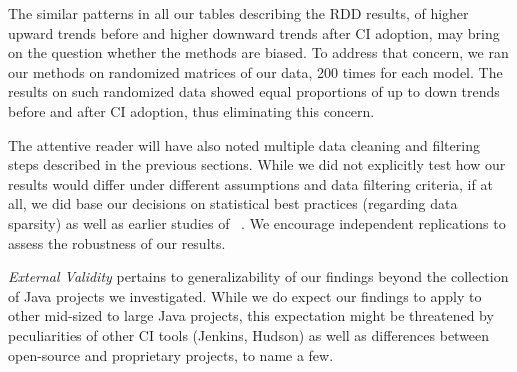  The similar patterns in all our tables describing the RDD results, of higher upward trends before and higher downward trends after CI adoption, may bring on the question whether the methods are biased. To address that concern, we ran our methods on randomized matrices of our data, 200 times for each model. The results on such randomized data showed equal proportions of up to down trends before and after CI adoption, thus eliminating this concern.
 
 
The attentive reader will have also noted multiple data cleaning and filtering 
steps described in the previous sections.
While we did not explicitly test how our results would differ under different
assumptions and data filtering criteria, if at all, we did base our decisions on
statistical best practices (\eg regarding data sparsity) as well as 
earlier studies of \Tvis~\cite{era14,%
VasilescuYWDF15, yue2015wait, BellerGZ16, Hilton2016, Yu2016}.
We encourage independent replications to assess the robustness of our results.
 


\smallskip \emph{External Validity} pertains to generalizability of our findings 
beyond the collection of \GH Java projects we investigated.
While we do expect our findings to apply to other mid-sized to large Java projects,
this expectation might be threatened by peculiarities of other CI tools (\eg Jenkins, 
Hudson) as well as differences between open-source and proprietary projects, 
to name a few.

